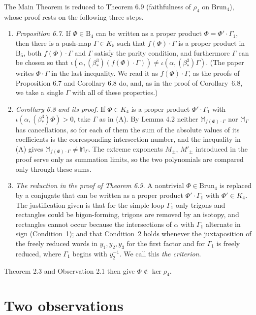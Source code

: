 \documentclass[11pt]{amsart}
\theoremstyle{remark}
\newcommand{\M}{\mathbb{M}}
\newcommand{\B}{\mathrm{B}}
\newcommand{\Brun}{\mathrm{Brun}}
\newcommand{\bs}{\beta^3_*}
\begin{document}
The Main Theorem is reduced to Theorem 6.9 (faithfulness of $\rho_4$ on $\Brun_4$), whose proof rests on the following three steps.

\begin{enumerate}
\item[(A)] \emph{Proposition 6.7.} If $\Phi\in \B_4$ can be written as a proper product $\Phi=\Phi'\cdot\Gamma_1$, then there is a push-map $\Gamma\in K_5$ such that $f(\Phi)\cdot\Gamma$ is a proper product in $\B_5$, both $f(\Phi)\cdot\Gamma$ and $\Gamma$ satisfy the parity condition, and furthermore $\Gamma$ can be chosen so that $\iota(\alpha,(\bs)(f(\Phi)\cdot\Gamma))\neq\iota(\alpha,(\bs)\Gamma)$. (The paper writes $\Phi\cdot\Gamma$ in the last inequality. We read it as $f(\Phi)\cdot\Gamma$, as the proofs of Proposition 6.7 and Corollary 6.8 do, and, as in the proof of Corollary~6.8, we take a single $\Gamma$ with all of these properties.)
\item[(B)] \emph{Corollary 6.8 and its proof.} If $\Phi\in K_4$ is a proper product $\Phi'\cdot\Gamma_1$ with $\iota(\alpha,(\bs)\Phi)>0$, take $\Gamma$ as in (A). By Lemma 4.2 neither $\M_{f(\Phi)\cdot\Gamma}$ nor $\M_\Gamma$ has cancellations, so for each of them the sum of the absolute values of its coefficients is the corresponding intersection number, and the inequality in (A) gives $\M_{f(\Phi)\cdot\Gamma}\neq\M_\Gamma$. The extreme exponents $M_\pm$, $M'_\pm$ introduced in the proof serve only as summation limits, so the two polynomials are compared only through these sums.
\item[(C)] \emph{The reduction in the proof of Theorem 6.9.} A nontrivial $\Phi\in\Brun_4$ is replaced by a conjugate that can be written as a proper product $\Phi'\cdot\Gamma_1$ with $\Phi'\in K_4$. The justification given is that for the simple loop $\Gamma_1$ only trigons and rectangles could be bigon-forming, trigons are removed by an isotopy, and rectangles cannot occur because the intersections of $\alpha$ with $\Gamma_1$ alternate in sign (Condition~1); and that Condition~2 holds whenever the juxtaposition of the freely reduced words in $y_1,y_2,y_3$ for the first factor and for $\Gamma_1$ is freely reduced, where $\Gamma_1$ begins with $y_2^{-1}$. We call this \emph{the criterion}.
\end{enumerate}
Theorem 2.3 and Observation 2.1 then give $\Phi\notin\ker\rho_4$.

\section{Two observations}
\end{document}
